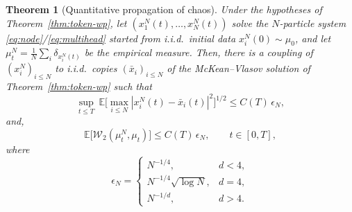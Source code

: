 \documentclass[11pt,a4wide]{article}
\newtheorem{theorem}{Theorem}[section]
\theoremstyle{definition}
\newcommand{\Wass}{\mathcal{W}}
\begin{document}
\begin{theorem}[Quantitative propagation of chaos]
\label{thm:poc-tokens}
Under the hypotheses of Theorem~\ref{thm:token-wp}, let $(x_1^N(t),\dots,x_N^N(t))$ solve the $N$-particle system \eqref{eq:node}/\eqref{eq:multihead} started from i.i.d.\ initial data $x_i^N(0)\sim\mu_0$, and let $\mu_t^N=\tfrac1N\sum_i\delta_{x_i^N(t)}$ be the empirical measure. Then, there is a coupling of $(x_i^N)_{i\le N}$ to i.i.d.\ copies $(\bar x_i)_{i\le N}$ of the McKean--Vlasov solution of Theorem~\ref{thm:token-wp} such that
\begin{equation}
\sup_{t\le T}\ \mathbb E\Big[\max_{i\le N}|x_i^N(t)-\bar x_i(t)|^2\Big]^{1/2} \le C(T)\,\epsilon_N, 
\end{equation}
and, %
\begin{equation}
\mathbb E\big[\Wass_2(\mu_t^N,\mu_t)\big] \le C(T)\,\epsilon_N , \qquad t\in[0,T],
\label{eq:poc-rate}
\end{equation}
where 
\[
\epsilon_N =
\begin{cases}
N^{-1/4}, & d<4,\\[2mm]
N^{-1/4} \sqrt{\log N}, & d=4,\\[2mm]
N^{-1/d}, & d>4.
\end{cases}
\]
\end{theorem}
\end{document}
